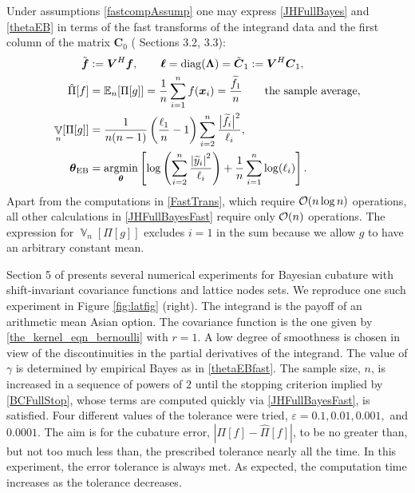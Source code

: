 \documentclass[sts]{imsart}
\numberwithin{equation}{section}
\theoremstyle{plain}
\newcommand{\vC}{\boldsymbol{C}}
\DeclareMathOperator{\Var}{\mathbb{V}}
\newcommand{\JH}{\citetalias{RatHic19a}}%
\newcommand{\vLambda}{\boldsymbol{\Lambda}}
\begin{document}
Under assumptions \eqref{fastcompAssump} one may express \eqref{JHFullBayes} and \eqref{thetaEB} in terms of the fast transforms of the integrand data and the first column of the matrix $\vC_0$ (\JH{} Sections 3.2, 3.3):
\begin{subequations} \label{JHFullBayesFast}
\begin{align}
\label{FastTrans}
\tvf & : = \vV^{H} \vf, \qquad \vell = \diag(\vLambda) = \tilde{\vC}_1 := \vV^{H} \vC_1, \\
    \hat{\Pi}[f] & =  \Ex_n[\Pi[g]] = \frac 1n \sum_{i=1}^n f(\vx_i) = \frac{\tf_1}{n} \qquad \text{the sample average},\\
\Var_n[\Pi[g]] & = \frac{1}{n(n-1)} \left(\frac{\ell_1}{n}  - 1  \right)\sum_{i=2}^n \frac{\bigl \lvert \tf_i\bigr \rvert^2}{\ell_i} , \\
\label{thetaEBfast}
\vtheta_{\textup{EB}} &= 
\argmin_{\vtheta}
\left[
\log\left(
\sum_{i=2}^n \frac{\abs{\widetilde{y}_i}^2}{\ell_i}
\right)  
  + 
\frac{1}{n}\sum_{i=1}^n \log(\ell_i)
\right].
\end{align}
\end{subequations}
Apart from the computations in \eqref{FastTrans}, which require $\operatorname{{\mathcal O}}(n \log n)$ operations, all other calculations in \eqref{JHFullBayesFast} require only $\operatorname{{\mathcal O}}(n)$ operations.  The expression for $\Var_n[\Pi[g]]$ excludes $i=1$ in the sum because we allow $g$ to have an arbitrary constant mean.

Section 5 of \JH{} presents several numerical experiments for Bayesian cubature with shift-invariant covariance functions and lattice nodes sets.  We reproduce one such experiment in Figure \ref{fig:latfig} (right).  The integrand is the payoff of an arithmetic mean Asian option.  The covariance function is the one given by \eqref{the_kernel_eqn_bernoulli} with $r=1$.  A low degree of smoothness is chosen in view of the discontinuities in the partial derivatives of the integrand.  The value of $\gamma$ is determined by empirical Bayes as in \eqref{thetaEBfast}.  The sample size, $n$, is increased in a sequence of powers of $2$ until the stopping criterion implied by \eqref{BCFullStop}, whose terms are computed quickly via \eqref{JHFullBayesFast}, is satisfied.  Four different values of the tolerance were tried, $\varepsilon = 0.1, 0.01, 0.001,$ and $0.0001$. The aim is for the cubature error, $|\Pi[f] - \hat{\Pi}[f]|$, to be no greater than, but not too much less than, the prescribed tolerance nearly all the time.  In this experiment, the error tolerance is always met.  As expected, the computation time increases as the tolerance decreases.  
\end{document}
